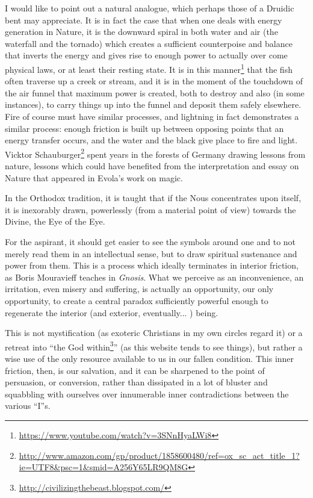 I would like to point out a natural analogue, which perhaps those of a Druidic bent may appreciate. It is in fact the case that when one deals with energy generation in Nature, it is the downward spiral in both water and air (the waterfall and the tornado) which creates a sufficient counterpoise and balance that inverts the energy and gives rise to enough power to actually over come physical laws, or at least their resting state. It is in this manner\footnote{\url{https://www.youtube.com/watch?v=3SNnHyaLWi8}} that the fish often traverse up a creek or stream, and it is in the moment of the touchdown of the air funnel that maximum power is created, both to destroy and also (in some instances), to carry things up into the funnel and deposit them safely elsewhere. Fire of course must have similar processes, and lightning in fact demonstrates a similar process: enough friction is built up between opposing points that an energy transfer occurs, and the water and the black give place to fire and light. Vicktor Schauburger\footnote{\url{http://www.amazon.com/gp/product/1858600480/ref=ox\_sc\_act\_title\_1?ie=UTF8&psc=1&smid=A256Y65LR9QM8G}} spent years in the forests of Germany drawing lessons from nature, lessons which could have benefited from the interpretation and essay on Nature that appeared in Evola's work on magic.

In the Orthodox tradition, it is taught that if the Nous concentrates upon itself, it is inexorably drawn, powerlessly (from a material point of view) towards the Divine, the Eye of the Eye.

For the aspirant, it should get easier to see the symbols around one and to not merely read them in an intellectual sense, but to draw spiritual sustenance and power from them. This is a process which ideally terminates in interior friction, as Boris Mouravieff teaches in \emph{Gnosis}. What we perceive as an inconvenience, an irritation, even misery and suffering, is actually an opportunity, our only opportunity, to create a central paradox sufficiently powerful enough to regenerate the interior (and exterior, eventually... ) being.

This is not mystification (as exoteric Christians in my own circles regard it) or a retreat into ``the God within\footnote{\url{http://civilizingthebeast.blogspot.com/}}'' (as this website tends to see things), but rather a wise use of the only resource available to us in our fallen condition. This inner friction, then, is our salvation, and it can be sharpened to the point of persuasion, or conversion, rather than dissipated in a lot of bluster and squabbling with ourselves over innumerable inner contradictions between the various ``I''s.

